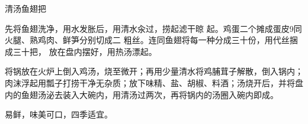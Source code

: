 \begin{recipe}{清汤鱼翅把}

\ingredients



\cooking

先将鱼翅洗净，用水发胀后，用清水汆过，捞起滤干晾 起。鸡蛋二个摊成蛋皮9同火腿、熟鸡肉、鲜笋分别切成二 粗丝。连同鱼翅将每一种分成三十份，用代丝捆成三十把， 放在盘内摆好，用热汤漂起。

\step 将锅放在火炉上倒入鸡汤，烧至微开；再用少量清水将鸡脯茸子解散，倒入锅内；肉沫浮起用瓢子打捞干净无杂质；放下味精、盐、胡椒、料酒；汤烧开后，并将盘内的鱼翅汤泌去装入大碗内，用清汤过两次，再将锅内的汤圈入碗内即成。

\notes

易鲜，味美可口，四季适宜。

\end{recipe}

